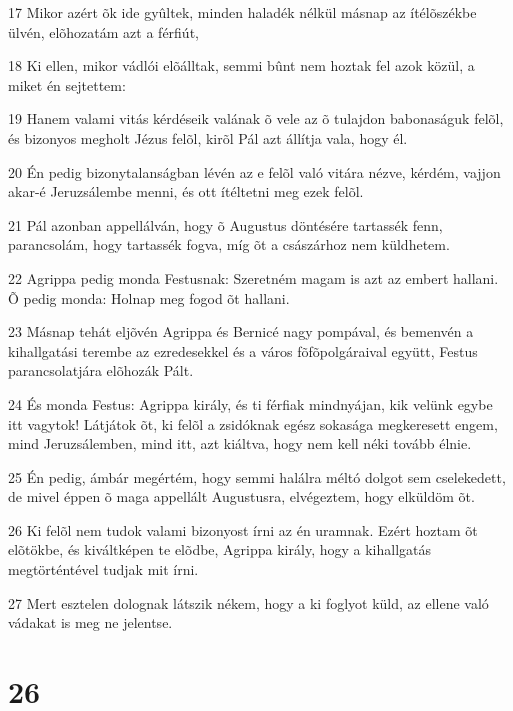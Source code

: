 \par 17 Mikor azért õk ide gyûltek, minden haladék nélkül másnap az ítélõszékbe ülvén, elõhozatám azt a férfiút,
\par 18 Ki ellen, mikor vádlói elõálltak, semmi bûnt nem hoztak fel azok közül, a miket én sejtettem:
\par 19 Hanem valami vitás kérdéseik valának õ vele az õ tulajdon babonaságuk felõl, és bizonyos megholt Jézus felõl, kirõl Pál azt állítja vala, hogy él.
\par 20 Én pedig bizonytalanságban lévén az e felõl való vitára nézve, kérdém, vajjon akar-é Jeruzsálembe menni, és ott ítéltetni meg ezek felõl.
\par 21 Pál azonban appellálván, hogy õ Augustus döntésére tartassék fenn, parancsolám, hogy tartassék fogva, míg õt a császárhoz nem küldhetem.
\par 22 Agrippa pedig monda Festusnak: Szeretném magam is azt az embert hallani. Õ pedig monda: Holnap meg fogod õt hallani.
\par 23 Másnap tehát eljõvén Agrippa és Bernicé nagy pompával, és bemenvén a kihallgatási terembe az ezredesekkel és a város fõfõpolgáraival együtt, Festus parancsolatjára elõhozák Pált.
\par 24 És monda Festus: Agrippa király, és ti férfiak mindnyájan, kik velünk egybe itt vagytok! Látjátok õt, ki felõl a zsidóknak egész sokasága megkeresett engem, mind Jeruzsálemben, mind itt, azt kiáltva, hogy nem kell néki tovább élnie.
\par 25 Én pedig, ámbár megértém, hogy semmi halálra méltó dolgot sem cselekedett, de mivel éppen õ maga appellált Augustusra, elvégeztem, hogy elküldöm õt.
\par 26 Ki felõl nem tudok valami bizonyost írni az én uramnak. Ezért hoztam õt elõtökbe, és kiváltképen te elõdbe, Agrippa király, hogy a kihallgatás megtörténtével tudjak mit írni.
\par 27 Mert esztelen dolognak látszik nékem, hogy a ki foglyot küld, az ellene való vádakat is meg ne jelentse.

\chapter{26}

